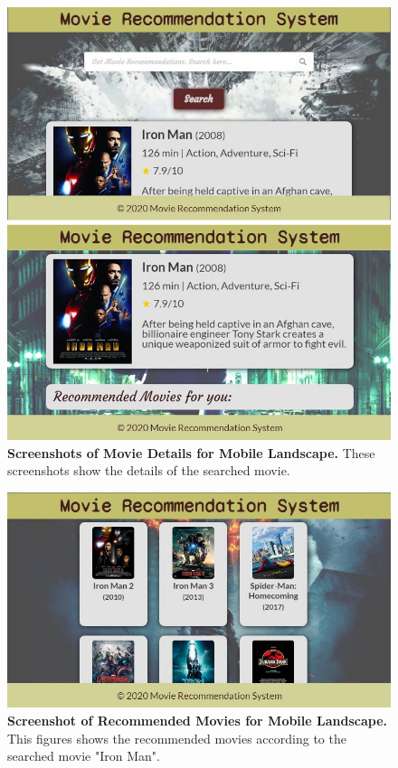\begin{figure}[ht]
	\centering
  	\includegraphics[width=1.0\textwidth]{images/mobile_l_2.JPG}
	\caption{\textbf{Screenshots of Movie Details for Mobile Landscape.} These screenshots show the details of the searched movie.}
  	\label{fig:mobile-l-2}
\end{figure}

\begin{figure}[ht]
	\centering
  	\includegraphics[width=1.0\textwidth]{images/mobile_l_3.JPG}
	\caption{\textbf{Screenshot of Recommended Movies for Mobile Landscape.} This figures shows the recommended movies according to the searched movie "Iron Man".}
  	\label{fig:mobile-l-3}
\end{figure}

